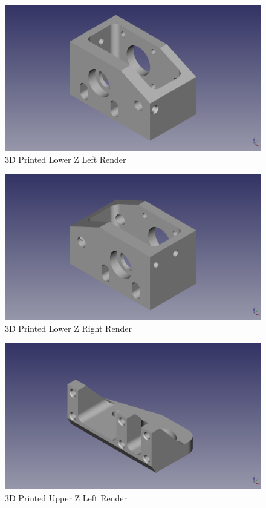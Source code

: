 \begin{figure}[H]
\centering
\includegraphics[keepaspectratio=true,angle=0,height=1.0\textheight,width=1.0\textwidth]{STL/lowzleft.stl.png}
\caption{3D Printed Lower Z Left Render}
\label{fig:lowzleftrender}
\end{figure}

\begin{figure}[H]
\centering
\includegraphics[keepaspectratio=true,angle=0,height=1.0\textheight,width=1.0\textwidth]{STL/lowzright.stl.png}
\caption{3D Printed Lower Z Right Render}
\label{fig:lowzrightrender}
\end{figure}

\begin{figure}[H]
\centering
\includegraphics[keepaspectratio=true,angle=0,height=1.0\textheight,width=1.0\textwidth]{STL/upzleft.stl.png}
\caption{3D Printed Upper Z Left Render}
\label{fig:upzleftrender}
\end{figure}

